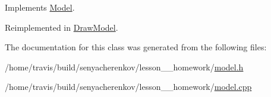 Implements \hyperlink{classModel_a853995c3960bc17b4df783d76ca5dfeb}{Model}.



Reimplemented in \hyperlink{classDrawModel_a64d70716532d50216910f4c37b75da32}{Draw\-Model}.



The documentation for this class was generated from the following files\-:\begin{DoxyCompactItemize}
\item 
/home/travis/build/senyacherenkov/lesson\-\_\-\_\-homework/\hyperlink{model_8h}{model.\-h}\item 
/home/travis/build/senyacherenkov/lesson\-\_\-\_\-homework/\hyperlink{model_8cpp}{model.\-cpp}\end{DoxyCompactItemize}
